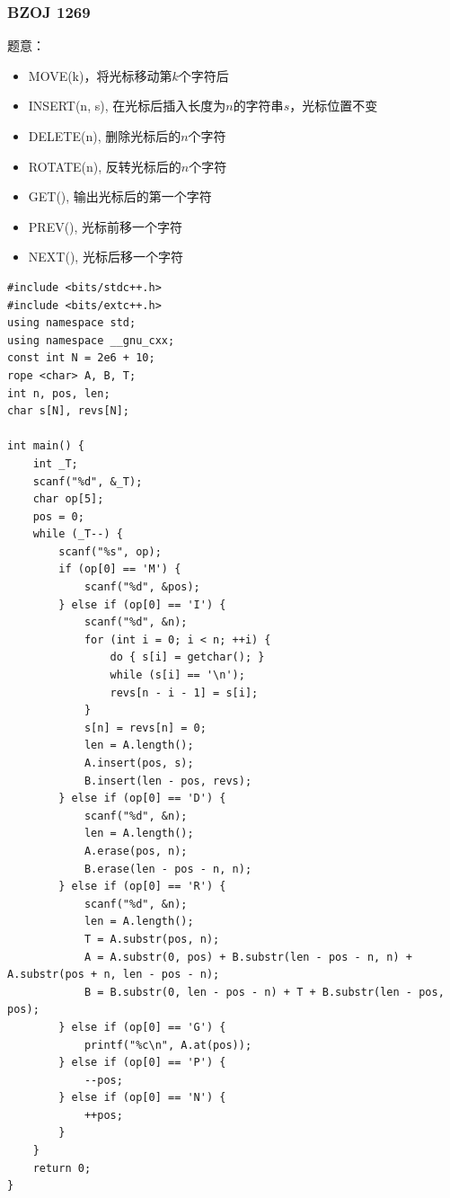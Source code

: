 \subsubsection{BZOJ 1269}

题意：\par
\begin{itemize}
\item MOVE(k)，将光标移动第$k$个字符后
\item INSERT(n, s), 在光标后插入长度为$n$的字符串$s$，光标位置不变
\item DELETE(n), 删除光标后的$n$个字符
\item ROTATE(n), 反转光标后的$n$个字符
\item GET(), 输出光标后的第一个字符
\item PREV(), 光标前移一个字符
\item NEXT(), 光标后移一个字符
\end{itemize}

\begin{lstlisting}
#include <bits/stdc++.h>
#include <bits/extc++.h>
using namespace std;
using namespace __gnu_cxx;
const int N = 2e6 + 10; 
rope <char> A, B, T;
int n, pos, len;
char s[N], revs[N];

int main() {
	int _T;
	scanf("%d", &_T);
	char op[5];
	pos = 0;
	while (_T--) {
		scanf("%s", op);
		if (op[0] == 'M') {
			scanf("%d", &pos);
		} else if (op[0] == 'I') {
			scanf("%d", &n);
			for (int i = 0; i < n; ++i) {
				do { s[i] = getchar(); }
				while (s[i] == '\n');
				revs[n - i - 1] = s[i];
			}
			s[n] = revs[n] = 0;
			len = A.length();
			A.insert(pos, s);
			B.insert(len - pos, revs);
		} else if (op[0] == 'D') {
			scanf("%d", &n);
			len = A.length();
			A.erase(pos, n);
			B.erase(len - pos - n, n);
		} else if (op[0] == 'R') {
			scanf("%d", &n);
			len = A.length();
			T = A.substr(pos, n);
			A = A.substr(0, pos) + B.substr(len - pos - n, n) + A.substr(pos + n, len - pos - n);
			B = B.substr(0, len - pos - n) + T + B.substr(len - pos, pos); 	
		} else if (op[0] == 'G') {
			printf("%c\n", A.at(pos));
		} else if (op[0] == 'P') {
			--pos;
		} else if (op[0] == 'N') {
			++pos;
		}
	}	
	return 0;
}
\end{lstlisting}

